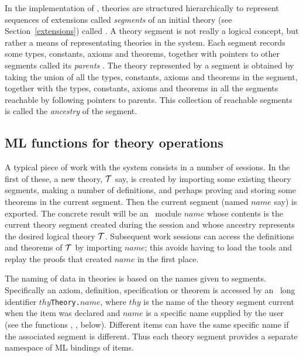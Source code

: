 In the implementation of \HOL, theories are structured hierarchically
to represent sequences of extensions called
\emph{segments}
of an initial theory (see Section~\ref{extensions}) called
. A theory segment is not really a logical
concept, but rather a means of representating theories in the
\HOL{} system. Each segment records some types, constants, axioms and
theorems, together with pointers to other segments called its
\emph{parents}
.
The theory represented by a segment is obtained by taking the
union of all the types, constants, axioms and theorems in the segment,
together with the types, constants, axioms and theorems in all the
segments reachable by following pointers to parents. This collection
of reachable segments is called the \emph{ancestry}
of the segment.

\subsection{ML functions for theory operations}
\label{theoryprims}

A typical piece of work
with the \HOL{} system consists in a number of sessions.  In the first of these, a
new theory, ${\cal T}$ say, is created by importing some existing theory
segments, making a number of definitions, and perhaps proving and
storing some theorems in the current segment. Then the current segment
(named $name$ say) is exported. The concrete result will be an \ML\
module $name$ whose contents is the current theory segment
created during the session and whose ancestry represents the desired
logical theory ${\cal T}$. Subsequent work sessions can access the
definitions and theorems of ${\cal T}$ by importing $name$;
this avoids having to load the tools and replay
the proofs that created $name$\ml{Theory} in the first place.

The naming of data in theories is based on the names given to segments.
Specifically an axiom, definition, specification or theorem is
accessed
by an \ML\ long identifier $thy${\small\verb+Theory.+}$name$, where
$thy$ is the name of the theory segment current when the item was
declared and $name$ is a specific name supplied by the user (see the
functions \ml{new\_axiom}, \ml{new\_definition}, below). Different items
can have the same specific name if the associated segment is different.
Thus each theory segment provides a separate namespace of ML bindings of
\HOL{} items.

